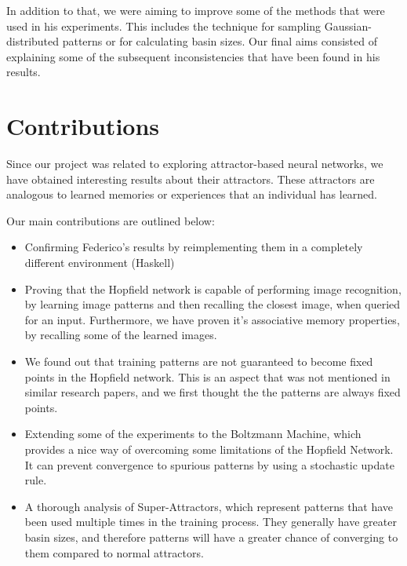 In addition to that, we were aiming to improve some of the methods that were used in his experiments. This includes the technique for sampling Gaussian-distributed patterns or for calculating basin sizes. Our final aims consisted of explaining some of the subsequent inconsistencies that have been found in his results.

\section{Contributions}

Since our project was related to exploring attractor-based neural networks, we have obtained interesting results about their attractors. These attractors are analogous to learned memories or experiences that an individual has learned.

Our main contributions are outlined below:
\begin{itemize}
\item Confirming Federico's results by reimplementing them in a completely different environment (Haskell)
\item Proving that the Hopfield network is capable of performing image recognition, by learning image patterns and then recalling the closest image, when queried for an input. Furthermore, we have proven it's associative memory properties, by recalling some of the learned images.
\item We found out that training patterns are not guaranteed to become fixed points in the Hopfield network. This is an aspect that was not mentioned in similar research papers, and we first thought the the patterns are always fixed points.
\item Extending some of the experiments to the Boltzmann Machine, which provides a nice way of overcoming some limitations of the Hopfield Network. It can prevent convergence to spurious patterns by using a stochastic update rule.
\item A thorough analysis of Super-Attractors, which represent patterns that have been used multiple times in the training process. They generally have greater basin sizes, and therefore patterns will have a greater chance of converging to them compared to normal attractors.
\end{itemize}
